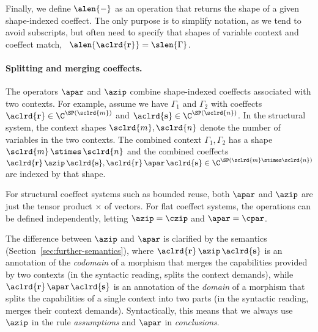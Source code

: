 Finally, we define $\alen{-}$ as an operation that returns the shape of a given shape-indexed
coeffect. The only purpose is to simplify notation, as we tend to avoid subscripts, but often need
to specify that shapes of variable context and coeffect match,
\eg~$\alen{\aclrd{\textbf{r}}} = \slen{\Gamma}$.

\paragraph{Splitting and merging coeffects.}
The operators $\apar$ and $\azip$ combine shape-indexed coeffects associated with two contexts.
For example, assume we have $\Gamma_1$ and $\Gamma_2$ with coeffects $\aclrd{\textbf{r}} \in
\C^{\SP(\sclrd{m})}$ and $\aclrd{\textbf{s}} \in \C^{\SP(\sclrd{n})}$. In the structural system, the
context shapes $\sclrd{m}, \sclrd{n}$ denote the number of variables in the two contexts. The
combined context $\Gamma_1, \Gamma_2$ has a shape $\sclrd{m}\,\stimes\,\sclrd{n}$ and the combined
coeffects $\aclrd{\textbf{r}} \,\azip\, \aclrd{\textbf{s}}, \aclrd{\textbf{r}} \,\apar\, \aclrd{\textbf{s}}
\in \C^{\SP(\sclrd{m} \stimes \sclrd{n})}$ are indexed by that shape.

For structural coeffect systems such as bounded reuse, both $\apar$ and $\azip$ are
just the tensor product $\times$ of vectors. For flat coeffect systems, the operations
can be defined independently, letting $\azip=\czip$ and $\apar=\cpar$.

The difference between $\azip$ and $\apar$ is clarified by the semantics (Sec\-tion~\ref{sec:further-semantics}),
where $\aclrd{\textbf{r}}\,\azip\,\aclrd{\textbf{s}}$ is an annotation of the \emph{codomain} of
a morphism that merges the capabilities provided by two contexts (in the syntactic
reading, splits the context demands), while $\aclrd{\textbf{r}}\,\apar\,\aclrd{\textbf{s}}$
is an annotation of the \emph{domain} of a morphism that splits the capabilities of a single
context into two parts (in the syntactic reading, merges their context demands).
Syntactically, this means that we always use $\azip$ in the rule \emph{assumptions} and
$\apar$ in \emph{conclusions}.


\newcommand{\tystmt}[2]{ (\text{\footnotesize{#1}})~~{#2} }
\newcommand{\ctxtrans}[3]{ #2 \rightsquigarrow #1, #3 }
\newcommand{\ctxtransnl}[3]{ \begin{array}{l} #2 \rightsquigarrow\\ #1, #3 \end{array}}

